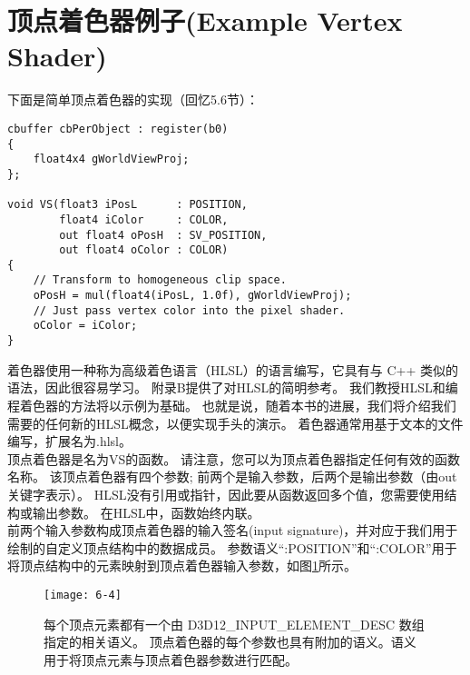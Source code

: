 \section{顶点着色器例子(Example Vertex Shader)}
\begin{flushleft}
下面是简单顶点着色器的实现（回忆5.6节）：
\end{flushleft}
\begin{lstlisting}
cbuffer cbPerObject : register(b0)
{
    float4x4 gWorldViewProj;
};

void VS(float3 iPosL      : POSITION,
        float4 iColor     : COLOR,
        out float4 oPosH  : SV_POSITION,
        out float4 oColor : COLOR)
{
    // Transform to homogeneous clip space.
    oPosH = mul(float4(iPosL, 1.0f), gWorldViewProj);
    // Just pass vertex color into the pixel shader.
    oColor = iColor;
}
\end{lstlisting}
\begin{flushleft}
着色器使用一种称为高级着色语言（HLSL）的语言编写，它具有与 C++ 类似的语法，因此很容易学习。 附录B提供了对HLSL的简明参考。 我们教授HLSL和编程着色器的方法将以示例为基础。 也就是说，随着本书的进展，我们将介绍我们需要的任何新的HLSL概念，以便实现手头的演示。 着色器通常用基于文本的文件编写，扩展名为.hlsl。\\
顶点着色器是名为VS的函数。 请注意，您可以为顶点着色器指定任何有效的函数名称。 该顶点着色器有四个参数; 前两个是输入参数，后两个是输出参数（由out关键字表示）。 HLSL没有引用或指针，因此要从函数返回多个值，您需要使用结构或输出参数。 在HLSL中，函数始终内联。\\
前两个输入参数构成顶点着色器的输入签名(input signature)，并对应于我们用于绘制的自定义顶点结构中的数据成员。 参数语义“:POSITION”和“:COLOR”用于将顶点结构中的元素映射到顶点着色器输入参数，如图\ref{fig:6-4}所示。
\end{flushleft}
\begin{figure}[h]
    \texttt{[image: 6-4]}
    \centering
    \caption{每个顶点元素都有一个由 D3D12\_INPUT\_ELEMENT\_DESC 数组指定的相关语义。 顶点着色器的每个参数也具有附加的语义。语义用于将顶点元素与顶点着色器参数进行匹配。}
    \label{fig:6-4}
\end{figure}

